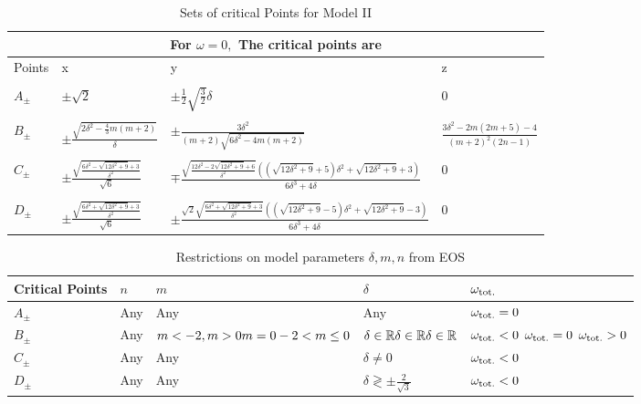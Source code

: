 \documentclass[a4paper,12pt]{article}
\begin{document}
\begin{table}[h!]
\centering
\begin{tabular}{|p{1cm}|p{4cm}|p{7.5cm}|p{2.8cm}|}
\hline
\multicolumn{4}{|c|}{For $ \omega = 0,  $ The critical points are }\\ 
\hline
Points &	x & y & z \\
\hline
\hline 
&&&\\
$ A_{\pm }$& $ \pm \sqrt{2} $ & $ \pm \frac{1}{2} \sqrt{\frac{3}{2}} \delta  $ & 	0 \\
\hline 
&	&&\\
$ B_{\pm }$& $\pm \frac{\sqrt{2 \delta^2-\frac{4}{3} m (m+2)}}{\delta }	$   & $\pm \frac{3 \delta ^2}{(m+2) \sqrt{6 \delta ^2-4 m (m+2)}}$  & $\frac{3 \delta ^2-2 m (2 m+5)-4}{(m+2)^2 (2 n-1)}$ \\
\hline 
&&&\\
$ C_{\pm} $ & $ \pm \frac{\sqrt{\frac{6 \delta ^2-\sqrt{12 \delta ^2+9}+3}{\delta ^2}}}{\sqrt{6}} $  & $ \mp \frac{\sqrt{\frac{12 \delta ^2-2 \sqrt{12 \delta ^2+9}+6}{\delta ^2}} \left(\left(\sqrt{12 \delta ^2+9}+5\right) \delta ^2+\sqrt{12 \delta ^2+9}+3\right)}{6 \delta ^3+4 \delta } $ & 0\\
\hline
&&&\\
$ D_{\pm} $ & $ \pm\frac{\sqrt{\frac{6 \delta ^2+\sqrt{12 \delta ^2+9}+3}{\delta ^2}}}{\sqrt{6}} $ & $ \pm\frac{\sqrt{2} \sqrt{\frac{6 \delta ^2+\sqrt{12 \delta ^2+9}+3}{\delta ^2}} \left(\left(\sqrt{12 \delta ^2+9}-5\right) \delta ^2+\sqrt{12 \delta ^2+9}-3\right)}{6 \delta ^3+4 \delta } $ & 0\\
\hline
\end{tabular}
\caption{Sets of critical Points for Model II}
\label{Tab:M2a}
\end{table}
\begin{table}[h!]
\centering
\begin{tabular}{|p{1.5cm}|p{1cm}|p{3cm}|p{2cm}|p{2.5cm}|}
\hline
Critical Points & $n$ & $m$ & $\delta$ & $\omega_{\rm tot.}$  \\
\hline
\hline
$ A_{\pm} $ & Any & Any & Any & $\omega_{\rm tot.} = 0 $ \\
\hline
$ B_{\pm} $ & Any & $ m< -2, m>0 \newline m =0 \newline -2<m\leq 0 $ & $\delta \in \mathbb{R} \newline \delta \in \mathbb{R}\newline \delta \in \mathbb{R}$ &  $ \omega_{\rm tot.}<0 $  \newline $\omega_{\rm tot.}=0$ \newline $\omega_{\rm tot.} > 0 $   \\
\hline 
\hline  
$ C_{\pm} $ & Any & Any & $ \delta \ne 0 $ & $\omega_{\rm tot.} < 0 $ \\
\hline 
$ D_{\pm} $ & Any & Any & $ \delta \gtrless \pm \frac{2}{\sqrt{3}} $ & $\omega_{\rm tot.} < 0 $ \\
\hline 
\end{tabular}
\caption{Restrictions on model parameters $\delta,m,n$ from EOS}  
\label{Tab:M2b}
\end{table}
\end{document}
